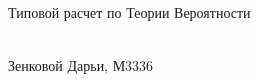 \begin{center}
\begin{Large}Типовой расчет по Теории Вероятности\end{Large}\\
Зенковой Дарьи, М3336 \end{center}